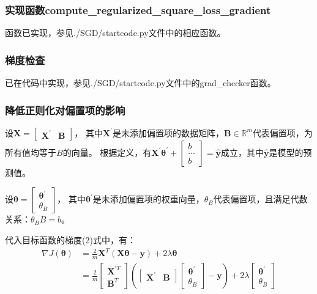 \documentclass[12pt, a4paper]{article}
\newcommand{\imat}{\bm}
\newcommand{\ivec}{\bm}
\newcommand{\Xm}{\imat{X}}
\newcommand{\thetav}{\ivec{\theta}}
\newcommand{\yv}{\ivec{y}}
\begin{document}
    \subsubsection{实现函数compute\_regularized\_square\_loss\_gradient}

        函数已实现，参见./SGD/startcode.py文件中的相应函数。

    \subsubsection{梯度检查}

        已在代码中实现，参见./SGD/startcode.py文件中的grad\_checker函数。

    \subsubsection{降低正则化对偏置项的影响}

        设$\Xm = \begin{bmatrix} \Xm^\prime & \ivec{B} \end{bmatrix}$，
        其中$\Xm^\prime$是未添加偏置项的数据矩阵，$\ivec{B} \in \mathbb{R}^m$代表偏置项，为所有值均等于$B$的向量。
        根据定义，有$\Xm^\prime \thetav^\prime + \begin{bmatrix} b \\ ... \\ b \end{bmatrix} = \hat{\yv}$成立，其中$\hat{\yv}$是模型的预测值。

        设$\thetav = \begin{bmatrix} \thetav^\prime \\ \theta_{B} \end{bmatrix}$，
        其中$\thetav^\prime$是未添加偏置项的权重向量，$\theta_{B}$代表偏置项，且满足代数关系：$\theta_{B} B = b$。

        代入目标函数的梯度(2)式中，有：
        \begin{align*}
        \nabla J(\thetav)
        &= \frac{2}{m} \Xm^T (\Xm \thetav - \yv) + 2 \lambda \thetav \\
        &= \frac{2}{m} \begin{bmatrix} \Xm^{\prime T} \\ \ivec{B}^T \end{bmatrix} (\begin{bmatrix} \Xm^\prime & \ivec{B} \end{bmatrix} \begin{bmatrix} \thetav^\prime \\ \theta_{B} \end{bmatrix} - \yv) + 2 \lambda \begin{bmatrix} \thetav^\prime \\ \theta_{B} \end{bmatrix}
        \end{align*}
\end{document}
